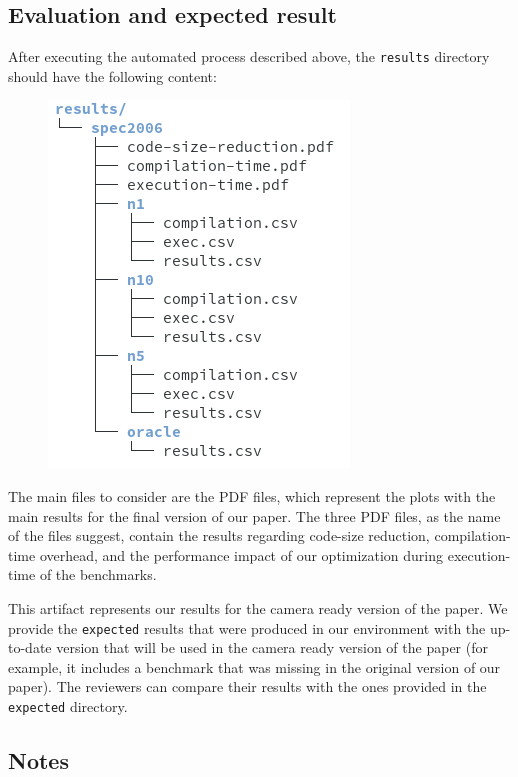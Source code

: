 \documentclass{sigplanconf}
\begin{document}
{%
\subsection{Evaluation and expected result}

After executing the automated process described above, the \texttt{results} directory should have the following content:

\begin{figure}[h]
\includegraphics[scale=0.5]{figs/results.png}
\end{figure}

The main files to consider are the PDF files, which represent the plots with the
main results for the final version of our paper.
The three PDF files, as the name of the files suggest, contain the results regarding code-size reduction, compilation-time overhead,
and the performance impact of our optimization during execution-time of the benchmarks.

This artifact represents our results for the camera ready version of the paper.
We provide the \texttt{expected} results that were produced in our environment
with the up-to-date version that will be used in the camera ready version of the
paper (for example, it includes a benchmark that was missing in the original
version of our paper).
The reviewers can compare their results with the ones provided in the
\texttt{expected} directory.

\subsection{Notes}

}
\end{document}
